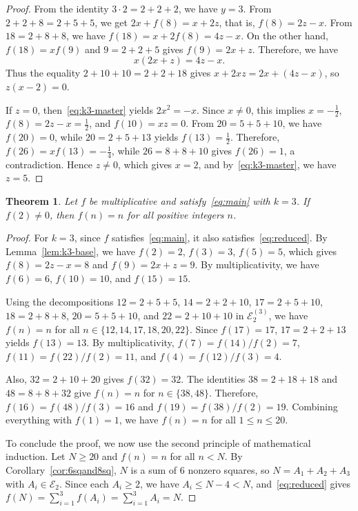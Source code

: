 \documentclass[11pt,a4paper]{amsart}
\newcommand{\E}{\mathcal{E}}
\theoremstyle{plain}
\newtheorem{theorem}{Theorem}[section]
\theoremstyle{definition}
\begin{document}
\begin{proof}
From the identity $3\cdot 2 = 2+2+2$, we have $y = 3$. From $ 2+2+8 = 2+5+5$, we get $2x + f(8) = x + 2z$, that is, $f(8) = 2z - x$. From $18 = 2+8+8$, we have $f(18) = x + 2f(8) = 4z - x$. On the other hand, $f(18) = x f(9)$ and $9 = 2+2+5$ gives $f(9) = 2x + z$. Therefore, we have
\begin{equation}\label{eq:k3-master}
    x(2x + z) = 4z - x.
\end{equation}
Thus the equality $2+10+10 = 2+2+18$ gives $x + 2xz = 2x + (4z - x)$, so $z(x - 2) = 0$.

If $z = 0$, then~\eqref{eq:k3-master} yields $2x^2 = -x$. Since $x \neq 0$, this implies $x = -\frac{1}{2}$, $f(8) = 2z-x=\frac{1}{2}$, and $f(10) = xz = 0$. From $20 = 5+5+10$, we have $f(20) = 0$, while $20 = 2+5+13$ yields $f(13) = \frac{1}{2}$. Therefore, $f(26) = x f(13) = -\frac{1}{4}$, while $26 = 8+8+10$ gives $f(26) = 1$, a contradiction. Hence $z\neq0$, which gives $x = 2$, and by~\eqref{eq:k3-master}, we have $z = 5$.
\end{proof}
\begin{theorem}\label{thm:k3}
Let $f$ be multiplicative and satisfy~\eqref{eq:main} with $k = 3$. If $f(2) \neq 0$, then $f(n) = n$ for all positive integers $n$.
\end{theorem}
\begin{proof}
For $k = 3$, since $f$ satisfies~\eqref{eq:main}, it also satisfies~\eqref{eq:reduced}. By Lemma~\ref{lem:k3-base}, we have $f(2)=2$, $f(3)=3$, $f(5)=5$, which gives $f(8)=2z-x=8$ and $f(9)=2x+z=9$. By multiplicativity, we have $f(6)=6$, $f(10)=10$, and $f(15)=15$.


Using the decompositions $12=2+5+5$, $14=2+2+10$, $17=2+5+10$, $18=2+8+8$, $20=5+5+10$, and $22=2+10+10$ in $\E_2^{(3)}$, we have
$f(n)=n$ for all $n \in \{12,14,17,18,20,22\}$.
Since $f(17)=17$, $17=2+2+13$ yields $f(13)=13$. By multiplicativity, $f(7)=f(14)/f(2)=7$, $f(11)=f(22)/f(2)=11$, and $f(4)=f(12)/f(3)=4$. 

Also, $32=2+10+20$ gives $f(32)=32$. The identities  $38=2+18+18$ and $48=8+8+32$ give $f(n)=n$ for $n \in \{38,48\}$. Therefore, $f(16)=f(48)/f(3)=16$ and $f(19)=f(38)/f(2)=19$. Combining everything with $f(1)=1$, we have $f(n)=n$ for all $1\leq n \leq 20$.

To conclude the proof, we now use the second principle of mathematical induction. Let $N \ge 20$ and $f(n)=n$ for all $n<N$. By Corollary~\ref{cor:6sqand8sq}, $N$ is a sum of $6$ nonzero squares, so $N = A_1 + A_2 + A_3$ with $A_i \in \E_2$. Since each $A_i\ge 2$, we have $A_i \leq N-4 < N$, and~\eqref{eq:reduced} gives $f(N) =\sum_{i=1}^{3}f(A_i) =\sum_{i=1}^{3} A_i =N$. 
\end{proof}
\end{document}
